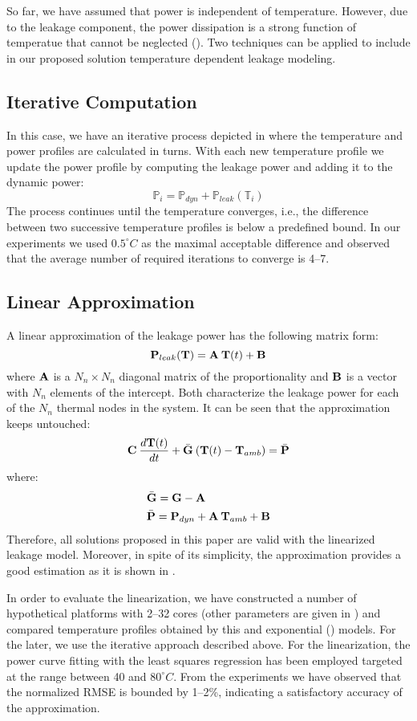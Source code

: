 So far, we have assumed that power is independent of temperature. However, due to the leakage component, the power dissipation is a strong function of temperatue that cannot be neglected (). Two techniques can be applied to include in our proposed solution temperature dependent leakage modeling.

\subsection{Iterative Computation}
In this case, we have an iterative process depicted in  where the temperature and power profiles are calculated in turns. With each new temperature profile we update the power profile by computing the leakage power and adding it to the dynamic power:
\[
  \mathbb{P}_i = \mathbb{P}_{dyn} + \mathbb{P}_{leak}(\mathbb{T}_i)
\]
The process continues until the temperature converges, i.e., the difference between two successive temperature profiles is below a predefined bound. In our experiments we used $0.5^\circ C$ as the maximal acceptable difference and observed that the average number of required iterations to converge is 4--7.

\subsection{Linear Approximation}
A linear approximation of the leakage power has the following matrix form:
\[
  \mathbf{P}_{leak}(\mathbf{T}) = \mathbf{A} \: \mathbf{T}(t) + \mathbf{B}
\]
where $\mathbf{A}$ is a $N_n \times N_n$ diagonal matrix of the proportionality and $\mathbf{B}$ is a vector with $N_n$ elements of the intercept. Both characterize the leakage power for each of the $N_n$ thermal nodes in the system. It can be seen that the approximation keeps  untouched:
\[
  \mathbf{C} \: \frac{d\mathbf{T}(t)}{dt} + \bar{\mathbf{G}} \: (\mathbf{T}(t) - \mathbf{T}_{amb}) = \bar{\mathbf{P}}
\]
where:
\begin{align*}
  & \bar{\mathbf{G}} = \mathbf{G} - \mathbf{A} \\
  & \bar{\mathbf{P}} = \mathbf{P}_{dyn} + \mathbf{A} \: \mathbf{T}_{amb} + \mathbf{B}
\end{align*}
Therefore, all solutions proposed in this paper are  valid with the linearized leakage model. Moreover, in spite of its simplicity, the approximation provides a good estimation as it is shown in \cite{liu2007}.

In order to evaluate the linearization, we have constructed a number of hypothetical platforms with 2--32 cores (other parameters are given in ) and compared temperature profiles obtained by this and exponential () models. For the later, we use the iterative approach described above. For the linearization, the power curve fitting with the least squares regression \cite{press2007} has been employed targeted at the range between 40 and $80^\circ C$. From the experiments we have observed that the normalized RMSE is bounded by 1--2\%, indicating a satisfactory accuracy of the approximation.
